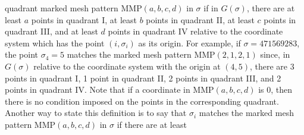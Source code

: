 \documentclass[
final,nomarks
]{dmtcs-episciences}
\newcommand{\MMP}{\mathrm{MMP}}
\begin{document}
quadrant marked mesh pattern \begin{math}\MMP(a,b,c,d)\end{math} in \begin{math}\sigma\end{math} if in \begin{math}G(\sigma)\end{math}, there are at least \begin{math}a\end{math} points in quadrant I, 
at least \begin{math}b\end{math} points in quadrant II, at least \begin{math}c\end{math} points in quadrant 
III, and at least \begin{math}d\end{math} points in quadrant IV relative to the coordinate system which has the point \begin{math}(i,\sigma_i)\end{math} as its origin.  
For example, 
if \begin{math}\sigma = 471569283\end{math}, the point \begin{math}\sigma_4 =5\end{math}  matches 
the marked mesh pattern \begin{math}\MMP(2,1,2,1)\end{math} since, in \begin{math}G(\sigma)\end{math} relative 
to the coordinate system with the origin at \begin{math}(4,5)\end{math},  
there are 3 points in quadrant I, 
1 point in quadrant II, 2 points in quadrant III, and 2 points in 
quadrant IV.  Note that if a coordinate 
in \begin{math}\MMP(a,b,c,d)\end{math} is 0, then there is no condition imposed 
on the points in the corresponding quadrant.  Another way to state this definition
is to say that \begin{math}\sigma_i\end{math} matches the marked mesh pattern 
\begin{math}\MMP(a,b,c,d)\end{math} in \begin{math}\sigma\end{math} if there are at least 
\end{document}
